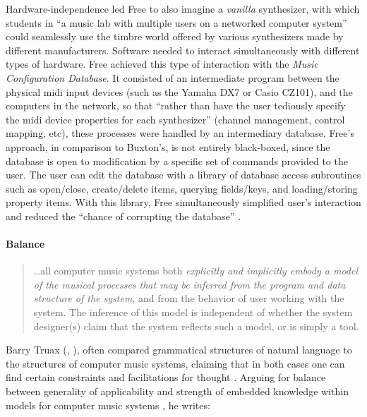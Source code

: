 	Hardware-independence led Free to also imagine a \textit{vanilla} synthesizer, with which students in ``a music lab with multiple users on a networked computer system'' \parencite[127]{DBLP:conf/icmc/FreeV88} could seamlessly use the timbre world offered by various synthesizers made by different manufacturers. Software needed to interact simultaneously with different types of hardware. Free achieved this type of interaction with the \textit{Music Configuration Database}. It consisted of an intermediate program between the physical \gls{midi} input devices (such as the Yamaha DX7 or Casio CZ101), and the computers in the network, so that ``rather than have the user tediously specify the \gls{midi} device properties for each synthesizer'' \parencite[133]{DBLP:conf/icmc/FreeV88} (channel management, control mapping, etc), these processes were handled by an intermediary database. Free's approach, in comparison to Buxton's, is not entirely black-boxed, since the database is open to modification by a specific set of commands provided to the user. The user can edit the database with a library of database access subroutines such as open/close, create/delete items, querying fields/keys, and loading/storing property items. With this library, Free simultaneously simplified user's interaction and reduced the ``chance of corrupting the database'' \parencite[137]{DBLP:conf/icmc/FreeV88}. 

	\paragraph{Balance}
	\label{computer:balance}


	\begin{quote}
		\dots all computer music systems both \textit{explicitly and implicitly embody a model of the musical processes that may be inferred from the program and data structure of the system}, and from the behavior of user working with the system. The inference of this model is independent of whether the system designer(s) claim that the system reflects such a model, or is simply a tool. \im \parencite[230-231]{Tru76:ACo}
	\end{quote}

	Barry Truax (\cite{Tru73:The,Tru76:ACo, Tru80:The}, \cite[Chapter~8]{Emm86:The}), often compared grammatical structures of natural language to the structures of computer music systems, claiming that in both cases one can find certain constraints and facilitations for thought \parencite[156]{Emm86:The}. Arguing for balance between generality of applicability and strength of embedded knowledge within models for computer music systems , he writes:

